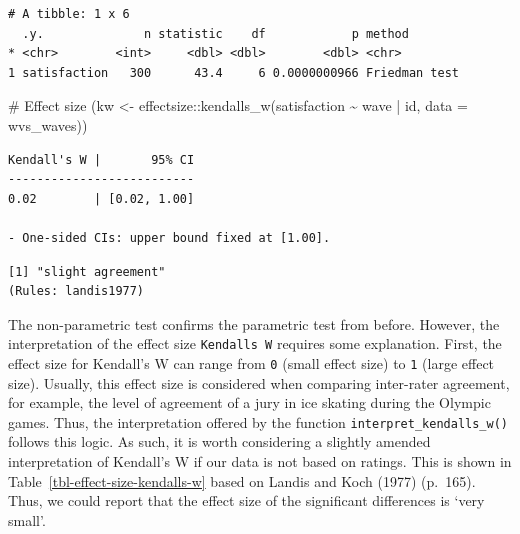 \documentclass[
  letterpaper,
  DIV=11,
  numbers=noendperiod]{scrreprt}
\newenvironment{Shaded}{\begin{snugshade}}{\end{snugshade}}
\newcommand{\AttributeTok}[1]{\textcolor[rgb]{0.40,0.45,0.13}{#1}}
\newcommand{\CommentTok}[1]{\textcolor[rgb]{0.37,0.37,0.37}{#1}}
\newcommand{\FunctionTok}[1]{\textcolor[rgb]{0.28,0.35,0.67}{#1}}
\newcommand{\NormalTok}[1]{\textcolor[rgb]{0.00,0.23,0.31}{#1}}
\newcommand{\OtherTok}[1]{\textcolor[rgb]{0.00,0.23,0.31}{#1}}
\newcommand{\SpecialCharTok}[1]{\textcolor[rgb]{0.37,0.37,0.37}{#1}}
\begin{document}
\begin{verbatim}
# A tibble: 1 x 6
  .y.              n statistic    df            p method       
* <chr>        <int>     <dbl> <dbl>        <dbl> <chr>        
1 satisfaction   300      43.4     6 0.0000000966 Friedman test
\end{verbatim}

\begin{Shaded}
\begin{Highlighting}[]
\CommentTok{\# Effect size}
\NormalTok{(kw }\OtherTok{\textless{}{-}}\NormalTok{ effectsize}\SpecialCharTok{::}\FunctionTok{kendalls\_w}\NormalTok{(satisfaction }\SpecialCharTok{\textasciitilde{}}\NormalTok{ wave }\SpecialCharTok{|}\NormalTok{ id,}
                       \AttributeTok{data =}\NormalTok{ wvs\_waves))}
\end{Highlighting}
\end{Shaded}

\begin{verbatim}
Kendall's W |       95% CI
--------------------------
0.02        | [0.02, 1.00]

- One-sided CIs: upper bound fixed at [1.00].
\end{verbatim}

\begin{Shaded}
\end{Shaded}

\begin{verbatim}
[1] "slight agreement"
(Rules: landis1977)
\end{verbatim}

The non-parametric test confirms the parametric test from before.
However, the interpretation of the effect size
\texttt{Kendall\textquotesingle{}s\ W} requires some explanation. First,
the effect size for Kendall's W can range from \texttt{0} (small effect
size) to \texttt{1} (large effect size). Usually, this effect size is
considered when comparing inter-rater agreement, for example, the level
of agreement of a jury in ice skating during the Olympic games. Thus,
the interpretation offered by the function
\texttt{interpret\_kendalls\_w()} follows this logic. As such, it is
worth considering a slightly amended interpretation of Kendall's W if
our data is not based on ratings. This is shown in
Table~\ref{tbl-effect-size-kendalls-w} based on Landis and Koch (1977)
(p.~165). Thus, we could report that the effect size of the significant
differences is `very small'.
\end{document}
